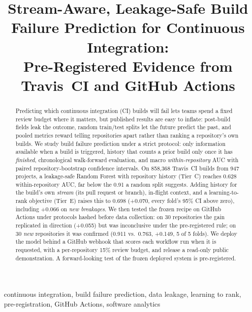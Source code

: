\documentclass[conference]{IEEEtran}
\newcommand{\tierC}{Tier~C}
\newcommand{\tierE}{Tier~E}
\begin{document}
\title{Stream-Aware, Leakage-Safe Build Failure Prediction for Continuous Integration:\\
Pre-Registered Evidence from Travis~CI and GitHub Actions}

\author{
}

\maketitle

\begin{abstract}
Predicting which continuous integration (CI) builds will fail lets teams spend a fixed review budget where it matters, but published results are easy to inflate: post-build fields leak the outcome, random train/test splits let the future predict the past, and pooled metrics reward telling repositories apart rather than ranking a repository's own builds. We study build failure prediction under a strict protocol: only information available when a build is triggered, history that counts a prior build only once it has \emph{finished}, chronological walk-forward evaluation, and macro \emph{within-repository} AUC with paired repository-bootstrap confidence intervals. On 858{,}368 Travis~CI builds from 947 projects, a leakage-safe Random Forest with repository history (\tierC) reaches 0.628 within-repository AUC, far below the 0.91 a random split suggests. Adding history for the build's own \emph{stream} (its pull request or branch), in-flight context, and a learning-to-rank objective (\tierE) raises this to 0.698 (+0.070, every fold's 95\% CI above zero), including +0.066 on \emph{new breakages}. We then tested the frozen recipe on GitHub Actions under protocols hashed before data collection: on 30 repositories the gain replicated in direction (+0.055) but was inconclusive under the pre-registered rule; on 30 \emph{new} repositories it was confirmed (0.911 vs.\ 0.763, +0.149, 5 of 5 folds). We deploy the model behind a GitHub webhook that scores each workflow run when it is requested, with a per-repository 15\% review budget, and release a read-only public demonstration. A forward-looking test of the frozen deployed system is pre-registered.
\end{abstract}

\begin{IEEEkeywords}
continuous integration, build failure prediction, data leakage, learning to rank, pre-registration, GitHub Actions, software analytics
\end{IEEEkeywords}
\end{document}
